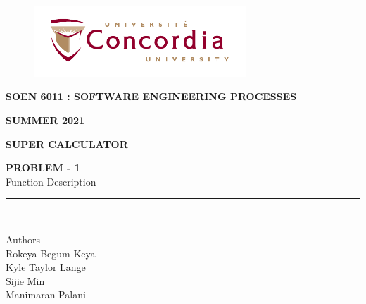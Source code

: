 \documentclass[a4paper, 11pt]{report}
\begin{document}
\begin{titlepage}
\vspace*{0.7in}
\begin{center}
\begin{figure}[htb]
\begin{center}
\includegraphics[width=8cm]{univ_logo}
\end{center}
\end{figure}
\vspace*{0.3in}
\begin{Large}
\textbf{SOEN 6011 : SOFTWARE ENGINEERING PROCESSES} \\
\end{Large}
\vspace*{0.1in}
\begin{Large}
\textbf{SUMMER 2021} \\
\end{Large}
\vspace*{0.9in}
\begin{Large}
\textbf{SUPER CALCULATOR} \\
\end{Large}
\vspace*{0.9in}
\begin{Large}
\textbf{PROBLEM - 1} \\
Function Description \\
\end{Large}
\vspace*{0.9in}
\rule{80mm}{0.1mm}\\
\vspace*{0.1in}
\begin{large}
Authors \\
\vspace*{0.1in}
Rokeya Begum Keya\\
\vspace*{0.1in}
Kyle Taylor Lange\\
\vspace*{0.1in}
Sijie Min\\
\vspace*{0.1in}
Manimaran Palani\\ 
\vspace*{0.3in}
\date{\normalsize\today} 
\end{large}
\end{center}
\end{titlepage}
\end{document}
